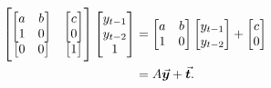 \documentclass[../MathsNotesBase.tex]{subfiles}
\begin{document}
{		\begin{align*}
		&&	\begin{bmatrix}
			\begin{bmatrix}a & b\\1 & 0\end{bmatrix} & \begin{bmatrix}c\\0\end{bmatrix} \\
			\begin{bmatrix}0 & 0\end{bmatrix} & \begin{bmatrix}1\end{bmatrix}	
		\end{bmatrix}
		\begin{bmatrix}y_{t-1}\\y_{t-2}\\1\end{bmatrix} &= 
		\begin{bmatrix}a & b\\1 & 0\end{bmatrix}\begin{bmatrix}y_{t-1}\\y_{t-2}\end{bmatrix} +
		\begin{bmatrix}c\\0\end{bmatrix} \\
		&&  &= A\vec{\bm{y}} + \vec{\bm{t}}. \\
		\end{align*}
		
}
\end{document}
